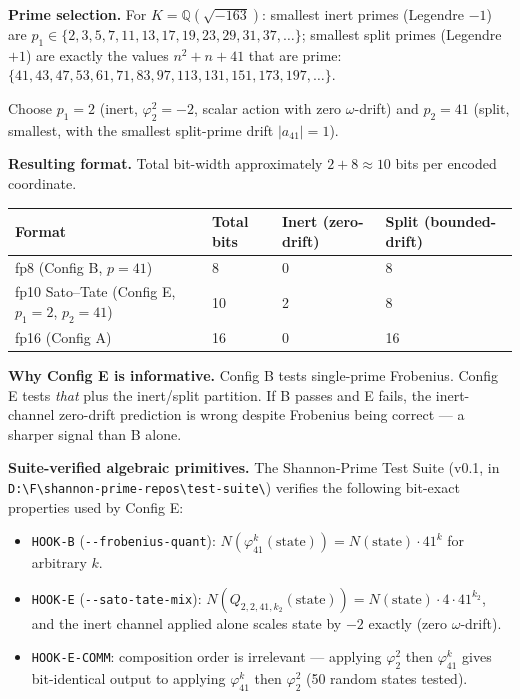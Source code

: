 \documentclass[
  11pt,
]{article}
\providecommand{\tightlist}{%
  \setlength{\itemsep}{0pt}\setlength{\parskip}{0pt}}
\begin{document}
\textbf{Prime selection.} For \(K = \mathbb{Q}(\sqrt{-163})\): smallest
inert primes (Legendre \(-1\)) are
\(p_1 \in \{2, 3, 5, 7, 11, 13, 17, 19, 23, 29, 31, 37, \dots\}\);
smallest split primes (Legendre \(+1\)) are exactly the values
\(n^2 + n + 41\) that are prime:
\(\{41, 43, 47, 53, 61, 71, 83, 97, 113, 131, 151, 173, 197, \dots\}\).

Choose \(p_1 = 2\) (inert, \(\varphi_2^2 = -2\), scalar action with zero
\(\omega\)-drift) and \(p_2 = 41\) (split, smallest, with the smallest
split-prime drift \(|a_{41}| = 1\)).

\textbf{Resulting format.} Total bit-width approximately
\(2 + 8 \approx 10\) bits per encoded coordinate.

\begin{longtable}[]{@{}llll@{}}
\toprule
Format & Total bits & Inert (zero-drift) & Split
(bounded-drift)\tabularnewline
\midrule
\endhead
fp8 (Config B, \(p = 41\)) & 8 & 0 & 8\tabularnewline
fp10 Sato--Tate (Config E, \(p_1=2\), \(p_2=41\)) & 10 & 2 &
8\tabularnewline
fp16 (Config A) & 16 & 0 & 16\tabularnewline
\bottomrule
\end{longtable}

\textbf{Why Config E is informative.} Config B tests single-prime
Frobenius. Config E tests \emph{that} plus the inert/split partition. If
B passes and E fails, the inert-channel zero-drift prediction is wrong
despite Frobenius being correct --- a sharper signal than B alone.

\textbf{Suite-verified algebraic primitives.} The Shannon-Prime Test
Suite (v0.1, in
\texttt{D:\textbackslash{}F\textbackslash{}shannon-prime-repos\textbackslash{}test-suite\textbackslash{}})
verifies the following bit-exact properties used by Config E:

\begin{itemize}
\tightlist
\item
  \texttt{HOOK-B} (\texttt{-\/-frobenius-quant}):
  \(N(\varphi_{41}^k(\text{state})) = N(\text{state}) \cdot 41^k\) for
  arbitrary \(k\).
\item
  \texttt{HOOK-E} (\texttt{-\/-sato-tate-mix}):
  \(N(Q_{2,2,41,k_2}(\text{state})) = N(\text{state}) \cdot 4 \cdot 41^{k_2}\),
  and the inert channel applied alone scales state by \(-2\) exactly
  (zero \(\omega\)-drift).
\item
  \texttt{HOOK-E-COMM}: composition order is irrelevant --- applying
  \(\varphi_2^2\) then \(\varphi_{41}^k\) gives bit-identical output to
  applying \(\varphi_{41}^k\) then \(\varphi_2^2\) (50 random states
  tested).
\end{itemize}
\end{document}
